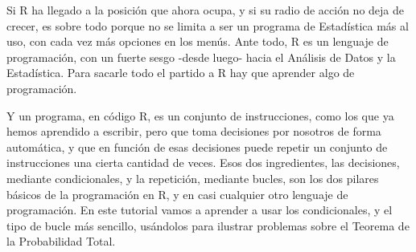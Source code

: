 \documentclass[10pt,a4paper]{article}\usepackage[]{graphicx}\usepackage[]{color}
\begin{document}
Si R ha llegado a la posición que ahora ocupa, y si su radio de acción no deja de crecer, es sobre todo porque no se limita a ser un programa de Estadística más al uso, con cada vez más opciones en los menús. Ante todo, R es un lenguaje de programación, con un fuerte sesgo -desde luego- hacia el Análisis de Datos y la Estadística. Para sacarle todo el partido a R hay que aprender algo de programación.

Y un programa, en código R, es un conjunto de instrucciones, como los que ya hemos aprendido a escribir, pero que toma decisiones por nosotros de forma automática, y que en función de esas decisiones puede repetir un conjunto de instrucciones una cierta cantidad de veces. Esos dos ingredientes, las decisiones, mediante {\sf condicionales}, y la repetición, mediante {\sf bucles}, son los dos pilares básicos de la programación en R, y en casi cualquier otro lenguaje de programación. En este tutorial vamos a aprender a usar los condicionales, y el tipo de bucle más sencillo, usándolos para ilustrar problemas sobre el Teorema de la Probabilidad Total.
\end{document}
